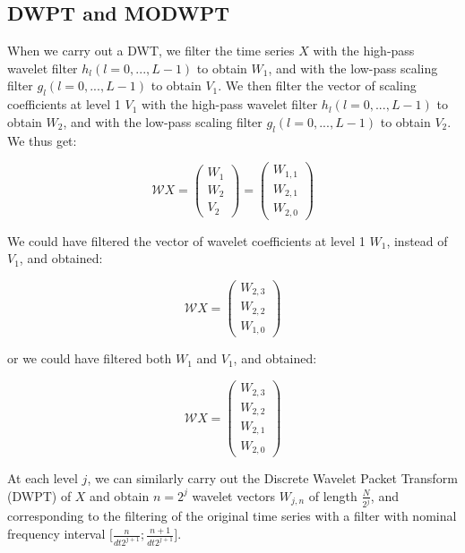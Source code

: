 \documentclass[methods.tex]{subfiles}
\begin{document}
\subsection{DWPT and MODWPT}

When we carry out a DWT, we filter the time series $X$ with the high-pass wavelet filter $h_l \left( l = 0 , ... , L - 1 \right)$ to obtain $W_1$, and with the low-pass scaling filter $g_l \left( l = 0 , ... , L - 1 \right)$ to obtain $V_1$. We then filter the vector of scaling coefficients at level 1 $V_1$ with the high-pass wavelet filter $h_l \left( l = 0 , ... , L - 1 \right)$ to obtain $W_2$, and with the low-pass scaling filter $g_l \left( l = 0 , ... , L - 1 \right)$ to obtain $V_2$. We thus get:

\begin{equation}
\mathcal{W} X = \begin{pmatrix}
W_1 \\
W_2 \\
V_2
\end{pmatrix} = \begin{pmatrix}
W_{1,1} \\
W_{2,1} \\
W_{2,0}
\end{pmatrix}
\end{equation}

We could have filtered the vector of wavelet coefficients at level 1 $W_1$, instead of $V_1$, and obtained:

\begin{equation}
\mathcal{W} X = \begin{pmatrix}
W_{2,3} \\
W_{2,2} \\
W_{1,0}
\end{pmatrix}
\end{equation}

or we could have filtered both $W_1$ and $V_1$, and obtained:

\begin{equation}
\mathcal{W} X = \begin{pmatrix}
W_{2,3} \\
W_{2,2} \\
W_{2,1} \\
W_{2,0}
\end{pmatrix}
\end{equation}

At each level $j$, we can similarly carry out the Discrete Wavelet Packet Transform (DWPT) of $X$ and obtain $n = 2^j$ wavelet vectors $W_{j,n}$ of length $\frac{N}{2^j}$, and corresponding to the filtering of the original time series with a filter with nominal frequency interval $\lbrack \frac{n}{dt 2^{j + 1}} ; \frac{n + 1}{dt 2^{j + 1}} \rbrack$. \\
\end{document}
